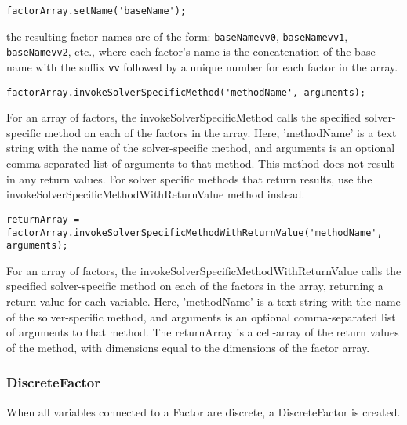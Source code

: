 \begin{lstlisting}
factorArray.setName('baseName');
\end{lstlisting}

the resulting factor names are of the form: \texttt{baseName\textunderscore vv0}, \texttt{baseName\textunderscore vv1}, \texttt{baseName\textunderscore vv2}, etc., where each factor's name is the concatenation of the base name with the suffix \texttt{\textunderscore vv} followed by a unique number for each factor in the array.



\begin{lstlisting}
factorArray.invokeSolverSpecificMethod('methodName', arguments);
\end{lstlisting}

For an array of factors, the invokeSolverSpecificMethod calls the specified solver-specific method on each of the factors in the array.  Here, 'methodName' is a text string with the name of the solver-specific method, and arguments is an optional comma-separated list of arguments to that method.  This method does not result in any return values.  For solver specific methods that return results, use the invokeSolverSpecificMethodWithReturnValue method instead.



\begin{lstlisting}
returnArray = factorArray.invokeSolverSpecificMethodWithReturnValue('methodName', arguments);
\end{lstlisting}

For an array of factors, the invokeSolverSpecificMethodWithReturnValue calls the specified solver-specific method on each of the factors in the array, returning a return value for each variable.  Here, 'methodName' is a text string with the name of the solver-specific method, and arguments is an optional comma-separated list of arguments to that method.  The returnArray is a cell-array of the return values of the method, with dimensions equal to the dimensions of the factor array.

\fi

\subsubsection{DiscreteFactor}

When all variables connected to a Factor are discrete, a DiscreteFactor is created.

